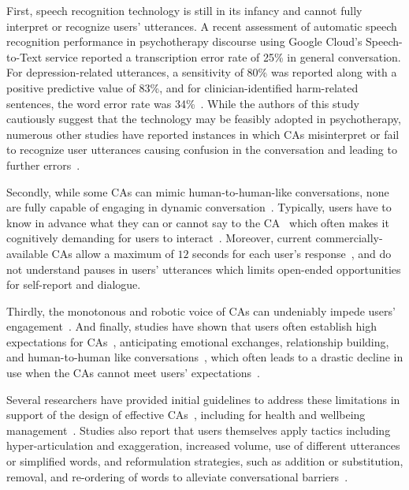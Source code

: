             First, speech recognition technology is still in its infancy and cannot fully interpret or recognize users' utterances. A recent assessment of automatic speech recognition performance in psychotherapy discourse using Google Cloud's Speech-to-Text service reported a transcription error rate of 25\% in general conversation. For depression-related utterances, a sensitivity of 80\% was reported along with a positive predictive value of 83\%, and for clinician-identified harm-related sentences, the word error rate was 34\%~\cite{miner2020assessing}. While the authors of this study cautiously suggest that the technology may be feasibly adopted in psychotherapy, numerous other studies have reported instances in which \ac{CA}s misinterpret or fail to recognize user utterances causing confusion in the conversation and leading to further errors~\cite{myers2018patterns, suhm2003towards, pyae2018investigating}.
            
            Secondly, while some \ac{CA}s can mimic human-to-human-like conversations, none are fully capable of engaging in dynamic conversation~\cite{onceakind2019minji}. Typically, users have to know in advance what they can or cannot say to the \ac{CA}~\cite{pradhan2018accessibility, corbett2016can, Learnability2017Furqan} which often makes it cognitively demanding for users to interact~\cite{pradhan2018accessibility}. Moreover, current commercially-available \ac{CA}s allow a maximum of $12$ seconds for each user's response~\cite{Rafal2018Workplace, pearl2016designing}, and do not understand pauses in users' utterances which limits open-ended opportunities for self-report and dialogue.
            
            Thirdly, the monotonous and robotic voice of \ac{CA}s can undeniably impede users' engagement~\cite{miner2016smartphone}. And finally, studies have shown that users often establish high expectations for \ac{CA}s~\cite{Gulfbetwee2016ewa}, anticipating emotional exchanges, relationship building, and human-to-human like conversations~\cite{onceakind2019minji}, which often leads to a drastic decline in use when the \ac{CA}s cannot meet users' expectations~\cite{Gulfbetwee2016ewa, onceakind2019minji}. 
            
            Several researchers have provided initial guidelines to address these limitations in support of the design of effective \ac{CA}s~\cite{suhm2003towards, wei2018evaluating,clark2019makes, murad2019revolution, langevin2021heuristic}, including for health and wellbeing management~\cite{shin2018designing}. Studies also report that users themselves apply tactics including hyper-articulation and exaggeration, increased volume, use of different utterances or simplified words, and reformulation strategies, such as addition or substitution, removal, and re-ordering of words to alleviate conversational barriers~\cite{myers2018patterns, mathias2016how, cheng2018doesn}. 
            
